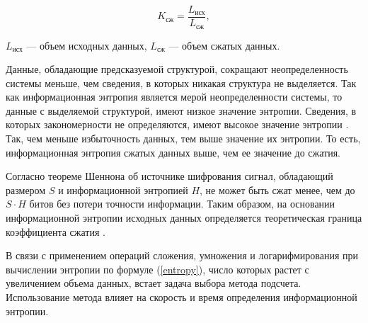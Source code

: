 \begin{equation}
	K_{\text{сж}} = \frac{L_{\text{исх}}}{L_{\text{сж}}},
\end{equation}

 $L_{\text{исх}}$ --- объем исходных данных, $L_{\text{сж}}$ --- объем сжатых данных.

Данные, обладающие предсказуемой структурой, сокращают неопределенность системы меньше, чем сведения, в которых никакая структура не выделяется. Так как информационная энтропия является мерой неопределенности системы, то данные с выделяемой структурой, имеют низкое значение энтропии. Сведения, в которых закономерности не определяются, имеют высокое значение энтропии \cite{relation}. Так, чем меньше избыточность данных, тем выше значение их энтропии. То есть, информационная энтропия сжатых данных выше, чем ее значение до сжатия.

Согласно теореме Шеннона об источнике шифрования сигнал, обладающий размером $S$ и информационной энтропией $H$, не может быть сжат менее, чем до $S \cdot H$ битов без потери точности информации. Таким образом, на основании информационной энтропии исходных данных определяется теоретическая граница коэффициента сжатия \cite{theorem}.

В связи с применением операций сложения, умножения и логарифмирования при вычислении энтропии по формуле (\ref{entropy}), число которых растет с увеличением объема данных, встает задача выбора метода подсчета. Использование метода влияет на скорость и время определения информационной энтропии.